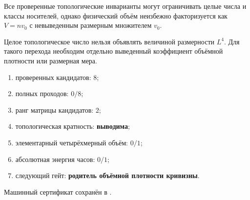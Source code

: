 \begin{theorem}
Все проверенные топологические инварианты могут ограничивать целые числа и
классы носителей, однако физический объём неизбежно факторизуется как
$V=n v_0$ с невыведенным размерным множителем $v_0$.
\end{theorem}

\begin{nogocriterion}
Целое топологическое число нельзя объявлять величиной размерности $L^4$.
Для такого перехода необходим отдельно выведенный коэффициент объёмной
плотности или размерная мера.
\end{nogocriterion}

\begin{protocol}\begin{enumerate}\raggedright
\item проверенных кандидатов: \textbf{$8$};
\item полных проходов: \textbf{$0/8$};
\item ранг матрицы кандидатов: \textbf{$2$};
\item топологическая кратность: \textbf{выводима};
\item элементарный четырёхмерный объём: \textbf{$0/1$};
\item абсолютная энергия часов: \textbf{$0/1$};
\item следующий гейт: \textbf{родитель объёмной плотности кривизны}.
\end{enumerate}\end{protocol}

Машинный сертификат сохранён в
.